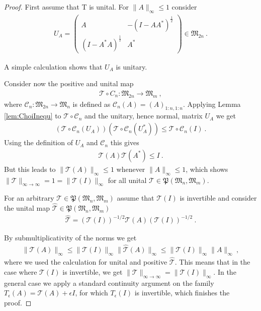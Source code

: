\documentclass[a4paper
               ,12pt
               ,DIV=12
               ,oneside
               ]
               {amsart}
\theoremstyle{plain}
\theoremstyle{remark}
\def\ra{\rightarrow}
\def\lb{\left(}
\def\rb{\right)}
\newcommand\M{\mathfrak{M}}
\newcommand{\Tm}{\mathcal{T}}
\newcommand{\Cm}{\mathcal{C}}
\begin{document}
\begin{proof}

First assume that T is unital. For $\| A\|_\infty\leq 1$ consider 
\begin{align*}
U_A = \begin{pmatrix} A & -\lb I-AA^{*}\rb^{\frac{1}{2}} \\  \lb I-A^{*}A\rb^{\frac{1}{2}} & A^{*} \end{pmatrix}\in\M_{2n}\medspace.
\end{align*}

A simple calculation shows that $U_A$ is unitary. 

Consider now the positive and unital map 
\begin{align*}
\Tm\circ C_{n}:\M_{2n}\ra\M_m\medspace,
\end{align*}
where $\Cm_{n}:\M_{2n}\ra\M_n$ is defined as $\Cm_{n}\lb A\rb = \lb A\rb_{1:n,1:n}$. Applying Lemma \ref{lem:ChoiInequ} to $\Tm\circ \Cm_{n}$ and the unitary, hence normal, matrix $U_A$ we get
\begin{align*}
\lb \Tm\circ \Cm_n\lb U_A\rb\rb\lb \Tm\circ \Cm_n\lb U^{*}_A\rb\rb\leq \Tm\circ \Cm_n\lb I\rb\medspace. 
\end{align*}
Using the definition of $U_A$ and $\Cm_n$ this gives
\begin{align*}
\Tm\lb A\rb \Tm\lb A^{*}\rb \leq I\medspace.
\end{align*}
But this leads to $\|\Tm\lb A\rb\|_{\infty}\leq 1$ whenever $\|A\|_{\infty}\leq 1$, which shows $\| \Tm\|_{\infty\ra\infty} = 1 =\| \Tm\lb I\rb\|_\infty$ for all unital $\Tm\in\mathfrak{P}\lb \M_n,\M_m\rb$. 

For an arbitrary $\Tm\in\mathfrak{P}\lb \M_n,\M_m\rb$ assume that $\Tm\lb I\rb$ is invertible and consider the unital map $\widehat{\Tm}\in\mathfrak{P}\lb \M_n,\M_m\rb$
\begin{align*}
\widehat{\Tm}=\lb \Tm\lb I\rb\rb^{-1/2}\Tm\lb A\rb\lb \Tm\lb I\rb\rb^{-1/2}\medspace.
\end{align*}

By submultiplicativity of the norms we get
\begin{align*}
\| \Tm\lb A\rb\|_{\infty}\leq \| \Tm\lb I\rb\|_\infty\| \widehat{\Tm}\lb A\rb\|_\infty\leq \| \Tm\lb I\rb\|_\infty\| A\|_\infty\medspace,
\end{align*}
where we used the calculation for unital and positive $\widehat{\Tm}$. This means that in the case where $\Tm\lb I\rb$ is invertible, we get $\| \Tm\|_{\infty\ra\infty} = \| \Tm\lb I\rb\|_\infty$. In the general case we apply a standard continuity argument on the family $T_\epsilon\lb A\rb = \Tm\lb A\rb + \epsilon I$, for which $T_\epsilon\lb I\rb$ is invertible, which finishes the proof. 

\end{proof}
\end{document}
